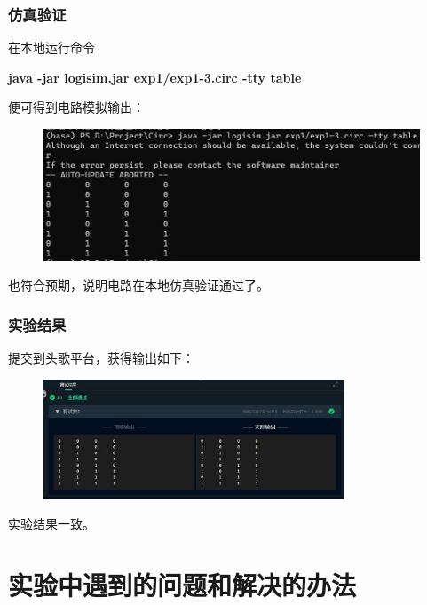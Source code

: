 \documentclass[UTF8]{ctexart}
\begin{document}
\subsubsection{仿真验证}

在本地运行命令

\begin{center}
    \textbf{java -jar logisim.jar exp1/exp1-3.circ -tty table}
\end{center}

便可得到电路模拟输出：

\begin{figure}[H]
    \centering
    \includegraphics[width = \textwidth]{images/native3.jpg}
\end{figure}

也符合预期，说明电路在本地仿真验证通过了。

\subsubsection{实验结果}

提交到头歌平台，获得输出如下：

\begin{figure}[H]
    \centering
    \includegraphics[width = 0.8\textwidth]{images/test3.jpg}
\end{figure}

实验结果一致。


\section{实验中遇到的问题和解决的办法}
\end{document}
